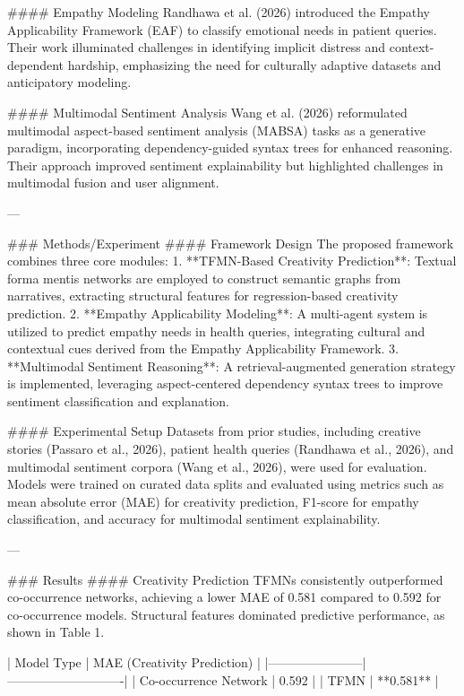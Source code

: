 #### Empathy Modeling  
Randhawa et al. (2026) introduced the Empathy Applicability Framework (EAF) to classify emotional needs in patient queries. Their work illuminated challenges in identifying implicit distress and context-dependent hardship, emphasizing the need for culturally adaptive datasets and anticipatory modeling.

#### Multimodal Sentiment Analysis  
Wang et al. (2026) reformulated multimodal aspect-based sentiment analysis (MABSA) tasks as a generative paradigm, incorporating dependency-guided syntax trees for enhanced reasoning. Their approach improved sentiment explainability but highlighted challenges in multimodal fusion and user alignment.

---

### Methods/Experiment  
#### Framework Design  
The proposed framework combines three core modules:
1. **TFMN-Based Creativity Prediction**: Textual forma mentis networks are employed to construct semantic graphs from narratives, extracting structural features for regression-based creativity prediction.
2. **Empathy Applicability Modeling**: A multi-agent system is utilized to predict empathy needs in health queries, integrating cultural and contextual cues derived from the Empathy Applicability Framework.
3. **Multimodal Sentiment Reasoning**: A retrieval-augmented generation strategy is implemented, leveraging aspect-centered dependency syntax trees to improve sentiment classification and explanation.

#### Experimental Setup  
Datasets from prior studies, including creative stories (Passaro et al., 2026), patient health queries (Randhawa et al., 2026), and multimodal sentiment corpora (Wang et al., 2026), were used for evaluation. Models were trained on curated data splits and evaluated using metrics such as mean absolute error (MAE) for creativity prediction, F1-score for empathy classification, and accuracy for multimodal sentiment explainability.

---

### Results  
#### Creativity Prediction  
TFMNs consistently outperformed co-occurrence networks, achieving a lower MAE of 0.581 compared to 0.592 for co-occurrence models. Structural features dominated predictive performance, as shown in Table 1.

| Model Type            | MAE (Creativity Prediction) |  
|-----------------------|----------------------------|  
| Co-occurrence Network | 0.592                     |  
| TFMN                 | **0.581**                 |  

